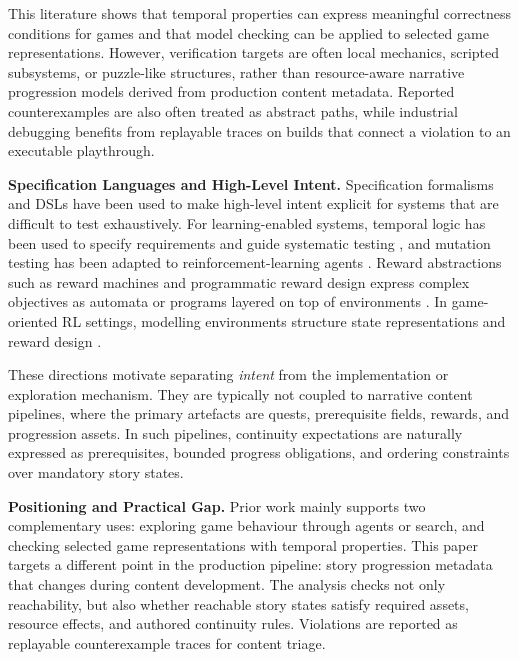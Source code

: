 \documentclass[conference]{IEEEtran}
\begin{document}
This literature shows that temporal properties can express meaningful
correctness conditions for games and that model checking can be applied
to selected game representations. However, verification targets are often
local mechanics, scripted subsystems, or puzzle-like structures, rather
than resource-aware narrative progression models derived from production
content metadata. Reported counterexamples are also often treated as
abstract paths, while industrial debugging benefits from replayable
traces on builds that connect a violation to an executable playthrough.

\noindent\textbf{Specification Languages and High-Level Intent.}
Specification formalisms and DSLs have been used to make high-level
intent explicit for systems that are difficult to test exhaustively. For
learning-enabled systems, temporal logic has been used to specify
requirements and guide systematic testing
\cite{Varshosaz2023FormalSpecRL}, and mutation testing has been adapted
to reinforcement-learning agents \cite{Lu2021MutationRL}. Reward
abstractions such as reward machines and programmatic reward design
express complex objectives as automata or programs layered on top of
environments \cite{Zhou2022ProgReward,Unniyankal2023RMLGym}. In
game-oriented RL settings, modelling environments structure state
representations and reward design \cite{Gomes2022RLGamesModeling}.

These directions motivate separating \emph{intent} from the implementation
or exploration mechanism. They are typically not coupled to narrative
content pipelines, where the primary artefacts are quests, prerequisite
fields, rewards, and progression assets. In such pipelines, continuity
expectations are naturally expressed as prerequisites, bounded progress
obligations, and ordering constraints over mandatory story states.

\noindent\textbf{Positioning and Practical Gap.}
Prior work mainly supports two complementary uses: exploring game
behaviour through agents or search, and checking selected game
representations with temporal properties. This paper targets a different
point in the production pipeline: story progression metadata that changes
during content development. The analysis checks not only reachability, but
also whether reachable story states satisfy required assets, resource
effects, and authored continuity rules. Violations are reported as
replayable counterexample traces for content triage.

\end{document}
